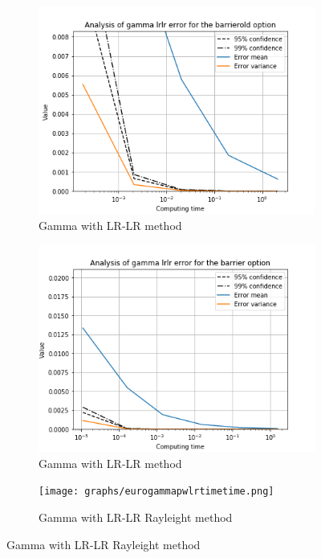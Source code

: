 \documentclass[11pt,a4paper,fleqn]{article}
\begin{document}
\begin{figure}[h!]
      \begin{subfigure}[b]{0.3\textwidth}
          \includegraphics[width=\textwidth]{graphs/barrieroldgammalrlrtime.png}
          \caption{Gamma with LR-LR method}
      \end{subfigure}
      \begin{subfigure}[b]{0.3\textwidth}
          \includegraphics[width=\textwidth]{graphs/barriergammalrlrtime.png}
          \caption{Gamma with LR-LR method}
      \end{subfigure}
      \begin{subfigure}[b]{0.3\textwidth}
          \texttt{[image: graphs/eurogammapwlrtimetime.png]}
          \caption{Gamma with LR-LR Rayleight method}
      \end{subfigure}


\end{figure}
\end{document}
